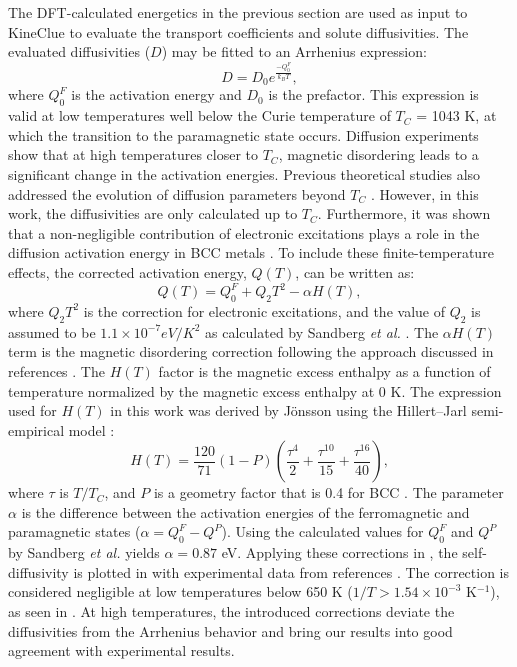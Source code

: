 \documentclass[preprint,12pt]{elsarticle}
\begin{document}
\noindent The DFT-calculated energetics in the previous section are used as input to KineClue \cite{schuler_kineclue_2020} to evaluate the transport coefficients and solute diffusivities. The evaluated diffusivities ($D$) may be fitted to an Arrhenius expression:
\begin{equation}
    D = D_0 e^{\frac{-Q_0^F}{k_B T}},
\end{equation}
where $Q_0^F$ is the activation energy and $D_0$ is the prefactor. This expression is valid at low temperatures well below the Curie temperature of $T_C$ = 1043 K, at which the transition to the paramagnetic state occurs. Diffusion experiments \cite{lubbehusen1990self, hettich1977self} show that at high temperatures closer to $T_C$, magnetic disordering leads to a significant change in the activation energies. Previous theoretical studies also addressed the evolution of diffusion parameters beyond $T_C$ \cite{PhysRevLett.124.215901, PhysRevB.107.094103}. However, in this work, the diffusivities are only calculated up to $T_C$.
Furthermore, it was shown that a non-negligible contribution of electronic excitations plays a role in the diffusion activation energy in BCC metals \cite{satta1998vacancy, sandberg2015modeling}. To include these finite-temperature effects, the corrected activation energy, $Q(T)$, can be written as:
\begin{equation}
\label{eq:corrected_Q}
    Q(T) = Q_0^F + Q_2T^2 -\alpha H(T),
\end{equation}
where $Q_2T^2$ is the correction for electronic excitations, and the value of $Q_2$ is assumed to be $1.1 \times 10^{-7} eV/K^2$ as calculated by Sandberg \textit{et al.} \cite{sandberg2015modeling}. The $\alpha H(T)$ term is the magnetic disordering correction following the approach discussed in references \cite{messina_systematic_2016, jonsson1992ferromagnetic}. The $H(T)$ factor is the magnetic excess enthalpy as a function of temperature normalized by the magnetic excess enthalpy at 0 K. The expression used for $H(T)$ in this work was derived by J\"{o}nsson \cite{jonsson1992ferromagnetic} using the Hillert--Jarl semi-empirical model \cite{hillert1978model}:
\begin{equation}
    H(T)=\frac{120}{71}(1-P)(\frac{\tau^{4}}{2}+\frac{\tau^{10}}{15}+\frac{\tau^{16}}{40}),
\end{equation}
where $\tau$ is $T/T_C$, and $P$ is a geometry factor that is 0.4 for BCC \cite{jonsson1992ferromagnetic}. The parameter $\alpha$ is the difference between the activation energies of the ferromagnetic and paramagnetic states ($\alpha = Q^F_0-Q^P$). Using the calculated values for $Q^F_0$ and $Q^P$ by Sandberg \textit{et al.}\cite{sandberg2015modeling} yields $\alpha = 0.87$ eV.
Applying these corrections in , the self-diffusivity is plotted in   with experimental data from references \cite{lubbehusen1990self, hettich1977self}. The correction is considered negligible at low temperatures below 650 K ($1/T > 1.54 \times 10^{-3}$ K$^{-1}$), as seen in . At high temperatures, the introduced corrections deviate the diffusivities from the Arrhenius behavior and bring our results into good agreement with experimental results. 
\end{document}
